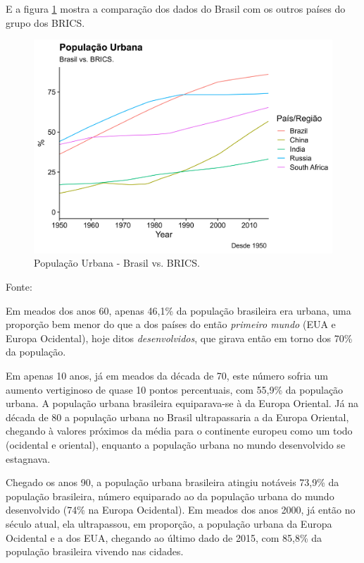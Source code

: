 \documentclass[
	12pt,				%
	oneside,			%
	a4paper,			%
	chapter=TITLE,		%
	section=TITLE,		%
	english,			%
	brazil				%
	]{abntex2}
\newcommand{\bcenter}{\begin{center}}
\newcommand{\ecenter}{\end{center}}
\begin{document}
E a figura \ref{fig:pop-urb-brazil-brics} mostra a comparação dos dados do
Brasil com os outros países do grupo dos BRICS.
\begin{figure}[H]

{\centering \includegraphics[width=0.8\linewidth]{images/pop-urb-brazil-brics-1} 

}

\caption{População Urbana - Brasil vs. BRICS.}\label{fig:pop-urb-brazil-brics}
\end{figure}
\bcenter

Fonte: \textcite{doi:10.1177/0959683609356587}
\ecenter

Em meados dos anos 60, apenas 46,1\% da população brasileira era urbana, uma
proporção bem menor do que a dos países do então \emph{primeiro mundo} (EUA e Europa
Ocidental), hoje ditos \emph{desenvolvidos}, que girava então em torno dos 70\% da
população.

Em apenas 10 anos, já em meados da década de 70, este número sofria um aumento
vertiginoso de quase 10 pontos percentuais, com 55,9\% da população urbana. A
população urbana brasileira equiparava-se à da Europa Oriental.
Já na década de 80 a população urbana no Brasil ultrapassaria a da Europa
Oriental, chegando à valores próximos da média para o continente europeu como um
todo (ocidental e oriental), enquanto a população urbana no mundo desenvolvido
se estagnava.

Chegado os anos 90, a população urbana brasileira atingiu notáveis 73,9\% da
população brasileira, número equiparado ao da população urbana do mundo
desenvolvido (74\% na Europa Ocidental). Em meados dos anos 2000, já então no
século atual, ela ultrapassou, em proporção, a população urbana da Europa
Ocidental e a dos EUA, chegando ao último dado de 2015, com 85,8\% da população
brasileira vivendo nas cidades.
\end{document}
